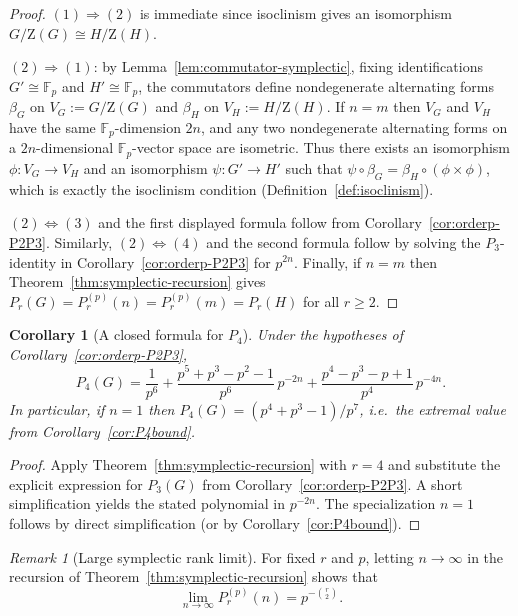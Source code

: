 \documentclass[11pt]{article}
\newtheorem{corollary}[theorem]{Corollary}
\theoremstyle{definition}
\theoremstyle{remark}
\newtheorem{remark}[theorem]{Remark}
\theoremstyle{definition}
\theoremstyle{plain}
\newcommand{\Z}{\mathrm{Z}}
\begin{document}
\begin{proof}
$(1)\Rightarrow(2)$ is immediate since isoclinism gives an isomorphism $G/\Z(G)\cong H/\Z(H)$.

$(2)\Rightarrow(1)$: by Lemma~\ref{lem:commutator-symplectic}, fixing identifications $G'\cong\mathbb F_p$ and
$H'\cong\mathbb F_p$, the commutators define nondegenerate alternating forms
$\beta_G$ on $V_G:=G/\Z(G)$ and $\beta_H$ on $V_H:=H/\Z(H)$.
If $n=m$ then $V_G$ and $V_H$ have the same $\mathbb F_p$-dimension $2n$, and any two nondegenerate alternating forms
on a $2n$-dimensional $\mathbb F_p$-vector space are isometric.
Thus there exists an isomorphism $\phi:V_G\to V_H$ and an isomorphism $\psi:G'\to H'$ such that
$\psi\circ \beta_G=\beta_H\circ(\phi\times\phi)$, which is exactly the isoclinism condition
(Definition~\ref{def:isoclinism}).

$(2)\Leftrightarrow(3)$ and the first displayed formula follow from Corollary~\ref{cor:orderp-P2P3}.
Similarly, $(2)\Leftrightarrow(4)$ and the second formula follow by solving the $P_3$-identity in
Corollary~\ref{cor:orderp-P2P3} for $p^{2n}$.
Finally, if $n=m$ then Theorem~\ref{thm:symplectic-recursion} gives $P_r(G)=P_r^{(p)}(n)=P_r^{(p)}(m)=P_r(H)$ for all $r\ge 2$.
\end{proof}

\begin{corollary}[A closed formula for $P_4$]\label{cor:orderp-P4}
Under the hypotheses of Corollary~\ref{cor:orderp-P2P3},
\[
P_4(G)
=\frac{1}{p^6}+\frac{p^5+p^3-p^2-1}{p^6}\,p^{-2n}
+\frac{p^4-p^3-p+1}{p^4}\,p^{-4n}.
\]
In particular, if $n=1$ then $P_4(G)=(p^4+p^3-1)/p^7$, i.e.\ the extremal value from Corollary~\ref{cor:P4bound}.
\end{corollary}

\begin{proof}
Apply Theorem~\ref{thm:symplectic-recursion} with $r=4$ and substitute the explicit expression for $P_3(G)$
from Corollary~\ref{cor:orderp-P2P3}.
A short simplification yields the stated polynomial in $p^{-2n}$.
The specialization $n=1$ follows by direct simplification (or by Corollary~\ref{cor:P4bound}).
\end{proof}

\begin{remark}[Large symplectic rank limit]\label{rem:symplectic-limit}
For fixed $r$ and $p$, letting $n\to\infty$ in the recursion of Theorem~\ref{thm:symplectic-recursion} shows that
\[
\lim_{n\to\infty} P_r^{(p)}(n)=p^{-\binom{r}{2}}.
\]
\end{remark}
\end{document}
